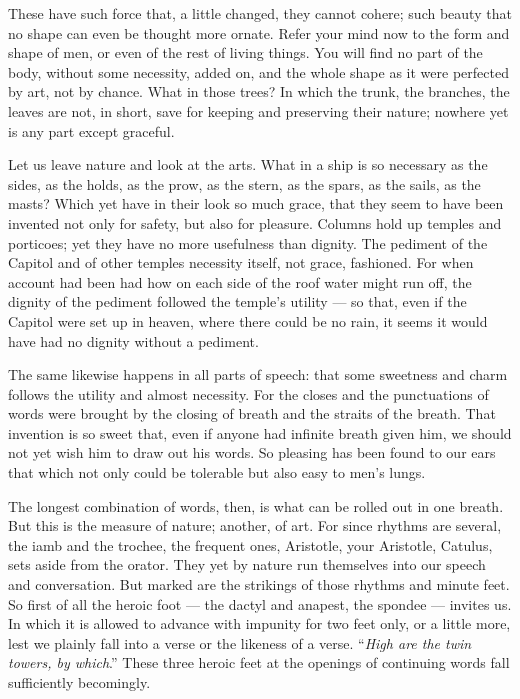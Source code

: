  These have such force that, a little changed, they cannot cohere; such beauty that no shape can even be thought more ornate. Refer your mind now to the form and shape of men, or even of the rest of living things. You will find no part of the body, without some necessity, added on, and the whole shape as it were perfected by art, not by chance. What in those trees? In which the trunk, the branches, the leaves are not, in short, save for keeping and preserving their nature; nowhere yet is any part except graceful.

 Let us leave nature and look at the arts. What in a ship is so necessary as the sides, as the holds, as the prow, as the stern, as the spars, as the sails, as the masts? Which yet have in their look so much grace, that they seem to have been invented not only for safety, but also for pleasure. Columns hold up temples and porticoes; yet they have no more usefulness than dignity. The pediment of the Capitol and of other temples necessity itself, not grace, fashioned. For when account had been had how on each side of the roof water might run off, the dignity of the pediment followed the temple's utility — so that, even if the Capitol were set up in heaven, where there could be no rain, it seems it would have had no dignity without a pediment.

 The same likewise happens in all parts of speech: that some sweetness and charm follows the utility and almost necessity. For the closes and the punctuations of words were brought by the closing of breath and the straits of the breath. That invention is so sweet that, even if anyone had infinite breath given him, we should not yet wish him to draw out his words. So pleasing has been found to our ears that which not only could be tolerable but also easy to men's lungs.

 The longest combination of words, then, is what can be rolled out in one breath. But this is the measure of nature; another, of art. For since rhythms are several, the iamb and the trochee, the frequent ones, Aristotle, your Aristotle, Catulus, sets aside from the orator. They yet by nature run themselves into our speech and conversation. But marked are the strikings of those rhythms and minute feet. So first of all the heroic foot — the dactyl and anapest, the spondee — invites us. In which it is allowed to advance with impunity for two feet only, or a little more, lest we plainly fall into a verse or the likeness of a verse. ``\textit{High are the twin towers, by which}.'' These three heroic feet at the openings of continuing words fall sufficiently becomingly.

